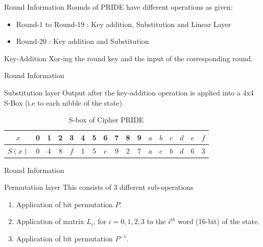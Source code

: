 \begin{frame}{Round Information}
    Rounds of PRIDE have different operations as given:
	\begin{itemize}
		\item Round-1 to Round-19 : Key addition, Substitution and Linear Layer
		\item Round-20 : Key addition and Substitution
	\end{itemize}
	\begin{block}{Key-Addition}
	    Xor-ing the round key and the input of the corresponding round.
	\end{block}
\end{frame}

\begin{frame}{Round Information}
    \begin{block}{Substitution layer}
        Output after the key-addition operation is applied into a 4x4 S-Box (i.e to each nibble of the state).
        \begin{table}[H]
		\centering
		\begin{tabular}{c|c|c|c|c|c|c|c|c|c|c|c|c|c|c|c|c}
			\hline
			$x$ & 0 & 1 & 2 & 3 & 4 & 5 & 6 & 7 & 8 & 9 & $ a $ & $ b $ & $ c $ & $ d $ & $ e $ & $ f $ \\ \hline
			$S(x)$ & 0 & 4 & 8 & $ f $ & 1 & 5 & $ e $ & 9 & 2 & 7 & $ a $ & $ c $ & $ b $ & $ d $ & 6 & 3 \\ \hline
		\end{tabular}
		\caption{S-box of Cipher PRIDE}
	\end{table}
    \end{block}
\end{frame}

\begin{frame}{Round Information}
    \begin{block}{Permutation layer}
        This consists of 3 different sub-operations
		\begin{enumerate}
			\item Application of bit permutation $P$.
			\item Application of matrix $ L_i $, for $ i = 0,1,2,3 $ to the $ i^{th} $ word (16-bit) of the state.
			\item Application of bit permutation $ P^{-1} $.
		\end{enumerate}
    \end{block}
\end{frame}

